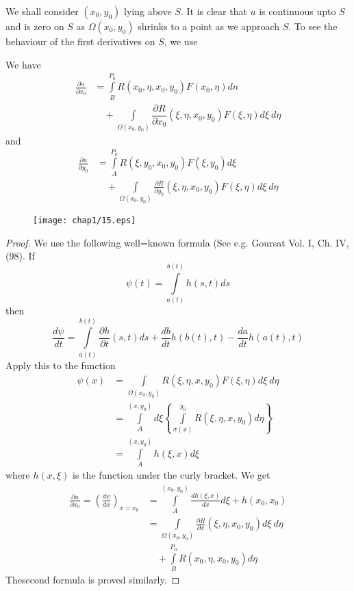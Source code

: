 We shall consider $(x_{0},y_{0})$ lying above $S$. It is clear that $u$ is continuous upto $S$ and is zero on $S$ as $\Omega(x_{0},y_{0})$ shrinks to a point as we approach $S$. To see the behaviour of the first derivatives on $S$, we use

\begin{lemma*}
We have
\begin{align*}
\frac{\partial u}{\partial x_{0}} &= \int\limits^{P_{0}}_{B}R(x_{0},\eta,x_{0},y_{0})F(x_{0},\eta)dn\\[3pt]
&\quad + \int\limits_{\Omega(x_{0},y_{0})}\dfrac{\partial R}{\partial x_{0}}(\xi, \eta, x_{0}, y_{0})F(\xi, \eta)d\xi \ d\eta
\end{align*}
and\pageoriginale
\begin{align*}
\frac{\partial u}{\partial y_{0}} &= \int\limits^{P_{0}}_{A}R(\xi,y_{0},x_{0},y_{0})F(\xi,y_{0})d\xi\\[3pt]
&\quad + \int\limits_{\Omega(x_{0},y_{0})}\frac{\partial R}{\partial y_{0}}(\xi, \eta, x_{0},y_{0})F(\xi,\eta)d\xi \ d\eta
\end{align*}
\begin{figure}[H]
\centering
\texttt{[image: chap1/15.eps]}
\end{figure}
\end{lemma*}

\begin{proof}
We use the following well=known formula (See e.g. Goursat Vol. I, Ch. IV, (98). If
$$
\psi(t)=\int\limits^{b(t)}_{a(t)}h(s,t)ds
$$
then
$$
\frac{d\psi}{dt}=\int\limits^{b(t)}_{a(t)}\frac{\partial h}{\partial t}(s,t)ds+\dfrac{db}{dt}h(b(t),t)-\dfrac{da}{dt}h(a(t),t)
$$
Apply this to the function
\begin{align*}
\psi(x) &= \int\limits_{\Omega(x_{0},y_{0})}R(\xi,\eta,x,y_{0})F(\xi,\eta)d\xi \ d\eta\\[3pt]
&= \int\limits^{(x,y_{0})}_{A}d\xi \left\{\int\limits^{y_{0}}_{\sigma(x)}R(\xi,\eta,x,y_{0})d\eta\right\}\\[3pt]
&= \int\limits^{(x,y_{0})}_{A}h(\xi,x)d\xi
\end{align*}
where $h(x,\xi)$ is the function under the curly bracket. We get
\begin{align*}
\frac{\partial u}{\partial x_{0}}=\left(\frac{d\psi}{dx}\right)_{x=x_{0}} &= \int\limits^{(x_{0},y_{0})}_{A}\frac{dh(\xi,x)}{dx}d\xi+h(x_{0},x_{0})\\[3pt]
&= \int\limits_{\Omega(x_{0},y_{0})}\frac{\partial R}{\partial x}(\xi, \eta, x_{0}, y_{0})d\xi \ d\eta\\[3pt]
&\quad +\int\limits^{P_{0}}_{B}R(x_{0},\eta,x_{0},y_{0})d\eta
\end{align*}
The\pageoriginale second formula is proved similarly.
\end{proof}

